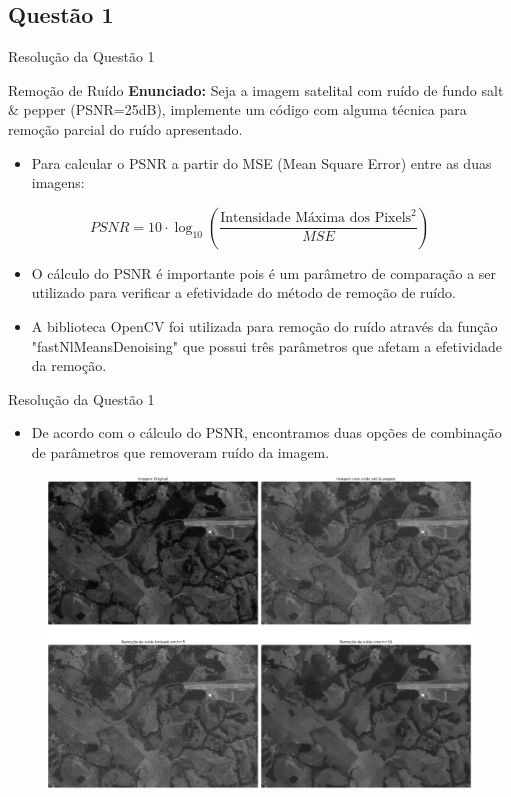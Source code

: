 \documentclass[xcolor=dvipsnames]{beamer}
\begin{document}
	\subsection{Questão 1}
	\begin{frame}{Resolução da Questão 1}
		\begin{block}{Remoção de Ruído}
			\textbf{Enunciado:} Seja a imagem satelital com ruído de fundo salt \& pepper (PSNR=25dB), implemente um código com alguma técnica para remoção parcial do ruído apresentado.
		\end{block}
		\begin{itemize}
			\item Para calcular o PSNR a partir do MSE (Mean Square Error) entre as duas imagens:
		\end{itemize}			
		\begin{equation}
			PSNR = 10 \cdot \log_{10}\left(\frac{{\text{Intensidade Máxima dos Pixels}^2}}{{MSE}}\right)
		\end{equation}
		\begin{itemize}
			\item O cálculo do PSNR é importante pois é um parâmetro de comparação a ser utilizado para verificar a efetividade do método de remoção de ruído.
			\item A biblioteca OpenCV foi utilizada para remoção do ruído através da função "fastNlMeansDenoising" que possui três parâmetros que afetam a efetividade da remoção.
		\end{itemize}			
	\end{frame}


	\begin{frame}{Resolução da Questão 1}
		\begin{itemize}
			\item De acordo com o cálculo do PSNR, encontramos duas opções de combinação de parâmetros que removeram ruído da imagem.
		\end{itemize}			
		\begin{figure}
			\centering
			\includegraphics[width=0.8\columnwidth]{Figuras/res1-1.png}
		\end{figure}
	\end{frame}
\end{document}
